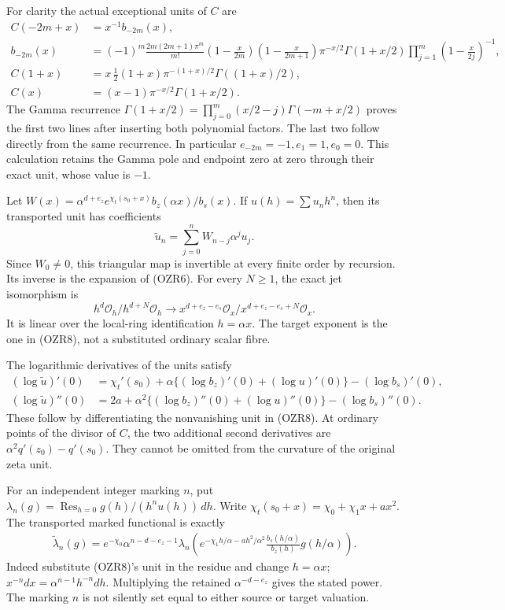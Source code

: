 \documentclass[
  10pt,
  a4paper,
]{article}
\begin{document}
For clarity the actual exceptional units of \(C\) are \[
\begin{aligned}
C(-2m+x)&=x^{-1}b_{-2m}(x),\\
b_{-2m}(x)&=(-1)^m\frac{2m(2m+1)\pi^m}{m!}
\left(1-\frac{x}{2m}\right)\left(1-\frac{x}{2m+1}\right)
\pi^{-x/2}\Gamma(1+x/2)
\prod_{j=1}^m\left(1-\frac{x}{2j}\right)^{-1},\\
C(1+x)&=x\,\tfrac12(1+x)\pi^{-(1+x)/2}\Gamma((1+x)/2),\\
C(x)&=(x-1)\pi^{-x/2}\Gamma(1+x/2).
\end{aligned}\tag{OZR9}
\] The Gamma recurrence
\(\Gamma(1+x/2)=\prod_{j=0}^m(x/2-j)\Gamma(-m+x/2)\) proves the first
two lines after inserting both polynomial factors. The last two follow
directly from the same recurrence. In particular
\(e_{-2m}=-1,e_1=1,e_0=0\). This calculation retains the Gamma pole and
endpoint zero at zero through their exact unit, whose value is \(-1\).

Let \(W(x)=\alpha^{d+e_z}e^{\chi_t(s_0+x)}b_z(\alpha x)/b_s(x)\). If
\(u(h)=\sum u_nh^n\), then its transported unit has coefficients \[
\widetilde u_n=\sum_{j=0}^n W_{n-j}\alpha^ju_j.
\tag{OZR10}
\] Since \(W_0\ne0\), this triangular map is invertible at every finite
order by recursion. Its inverse is the expansion of (OZR6). For every
\(N\ge1\), the exact jet isomorphism is \[
h^d\mathcal O_h/h^{d+N}\mathcal O_h
\longrightarrow
x^{d+e_z-e_s}\mathcal O_x/x^{d+e_z-e_s+N}\mathcal O_x.
\] It is linear over the local-ring identification \(h=\alpha x\). The
target exponent is the one in (OZR8), not a substituted ordinary scalar
fibre.

The logarithmic derivatives of the units satisfy \[
\begin{aligned}
(\log\widetilde u)'(0)
&=\chi_t'(s_0)+\alpha\{(\log b_z)'(0)+(\log u)'(0)\}
 -(\log b_s)'(0),\\
(\log\widetilde u)''(0)
&=2a+\alpha^2\{(\log b_z)''(0)+(\log u)''(0)\}
 -(\log b_s)''(0).
\end{aligned}\tag{OZR11}
\] These follow by differentiating the nonvanishing unit in (OZR8). At
ordinary points of the divisor of \(C\), the two additional second
derivatives are \(\alpha^2q'(z_0)-q'(s_0)\). They cannot be omitted from
the curvature of the original zeta unit.

For an independent integer marking \(n\), put
\(\lambda_n(g)=\operatorname{Res}_{h=0}g(h)/(h^nu(h))\,dh\). Write
\(\chi_t(s_0+x)=\chi_0+\chi_1x+ax^2\). The transported marked functional
is exactly \[
\begin{aligned}
\widetilde\lambda_n(g)=e^{-\chi_0}\alpha^{n-d-e_z-1}
\lambda_n\left(
e^{-\chi_1h/\alpha-ah^2/\alpha^2}
\frac{b_s(h/\alpha)}{b_z(h)}g(h/\alpha)\right).
\end{aligned}\tag{OZR12}
\] Indeed substitute (OZR8)'s unit in the residue and change
\(h=\alpha x\); \(x^{-n}dx=\alpha^{n-1}h^{-n}dh\). Multiplying the
retained \(\alpha^{-d-e_z}\) gives the stated power. The marking \(n\)
is not silently set equal to either source or target valuation.
\end{document}
